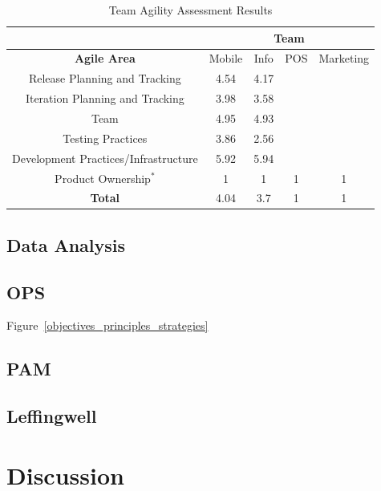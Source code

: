 \begin{table} [H]
\caption{Team Agility Assessment Results}
\label{table:taa_results}
\begin{tabular}{| c | c | c | c | c |}
\hline
  & \multicolumn{4}{c|}{\textbf{Team}} \\ \hline
\textbf{Agile Area} & Mobile & Info & POS & Marketing \\ \hline
Release Planning and Tracking & 4.54 & 4.17 &  &  \\ \hline
Iteration Planning and Tracking & 3.98 & 3.58 & &  \\ \hline
Team & 4.95 & 4.93 &  &  \\ \hline
Testing Practices & 3.86 & 2.56 &  &  \\ \hline
Development Practices/Infrastructure & 5.92 & 5.94 &  &  \\ \hline
Product Ownership$^\ast$ & 1 & 1 & 1 & 1 \\ \hline 
\textbf{Total} & 4.04 & 3.7 & 1 & 1 \\ \hline
\end{tabular}
\end{table}

\subsection{Data Analysis}


\subsection{OPS}
Figure~\ref{objectives_principles_strategies}
\subsection{PAM}
\subsection{Leffingwell}
\section{Discussion}
